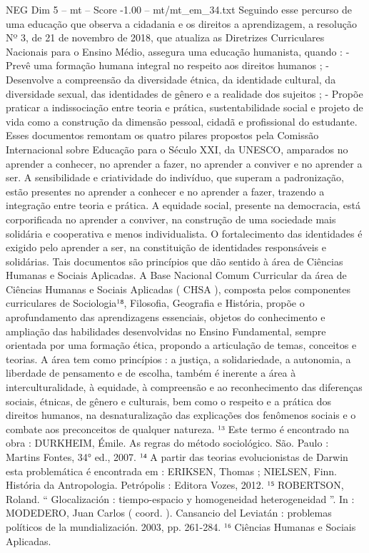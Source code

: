 \begin{textsample}{NEG Dim 5 – mt – Score -1.00 – mt/mt\_em\_34.txt}
Seguindo esse percurso de uma educação que observa a cidadania e os direitos a aprendizagem, a resolução Nº 3, de 21 de novembro de 2018, que atualiza as Diretrizes Curriculares Nacionais para o Ensino Médio, assegura uma educação humanista, quando : - Prevê uma formação humana integral no respeito aos direitos humanos ; - Desenvolve a compreensão da diversidade étnica, da identidade cultural, da diversidade sexual, das identidades de gênero e a realidade dos sujeitos ; - Propõe praticar a indissociação entre teoria e prática, sustentabilidade social e projeto de vida como a construção da dimensão pessoal, cidadã e profissional do estudante.
Esses documentos remontam os quatro pilares propostos pela Comissão Internacional sobre Educação para o Século XXI, da UNESCO, amparados no aprender a conhecer, no aprender a fazer, no aprender a conviver e no aprender a ser.
A sensibilidade e criatividade do indivíduo, que superam a padronização, estão presentes no aprender a conhecer e no aprender a fazer, trazendo a integração entre teoria e prática.
A equidade social, presente na democracia, está corporificada no aprender a conviver, na construção de uma sociedade mais solidária e cooperativa e menos individualista.
O fortalecimento das identidades é exigido pelo aprender a ser, na constituição de identidades responsáveis e solidárias.
Tais documentos são princípios que dão sentido à área de Ciências Humanas e Sociais Aplicadas.
A Base Nacional Comum Curricular da área de Ciências Humanas e Sociais Aplicadas ( CHSA ), composta pelos componentes curriculares de Sociologia¹⁸, Filosofia, Geografia e História, propõe o aprofundamento das aprendizagens essenciais, objetos do conhecimento e ampliação das habilidades desenvolvidas no Ensino Fundamental, sempre orientada por uma formação ética, propondo a articulação de temas, conceitos e teorias.
A área tem como princípios : a justiça, a solidariedade, a autonomia, a liberdade de pensamento e de escolha, também é inerente a área à interculturalidade, à equidade, à compreensão e ao reconhecimento das diferenças sociais, étnicas, de gênero e culturais, bem como o respeito e a prática dos direitos humanos, na desnaturalização das explicações dos fenômenos sociais e o combate aos preconceitos de qualquer natureza. ¹³ Este termo é encontrado na obra : DURKHEIM, Émile.
As regras do método sociológico.
São.
Paulo : Martins Fontes, 34{\EmojiFont °} ed., 2007. ¹⁴ A partir das teorias evolucionistas de Darwin esta problemática é encontrada em : ERIKSEN, Thomas ; NIELSEN, Finn.
História da Antropologia.
Petrópolis : Editora Vozes, 2012. ¹⁵ ROBERTSON, Roland. “ Glocalización : tiempo-espacio y homogeneidad heterogeneidad ”.
In : MODEDERO, Juan Carlos ( coord. ).
Cansancio del Leviatán : problemas políticos de la mundialización. 2003, pp. 261-284. ¹⁶ Ciências Humanas e Sociais Aplicadas.

\end{textsample}
